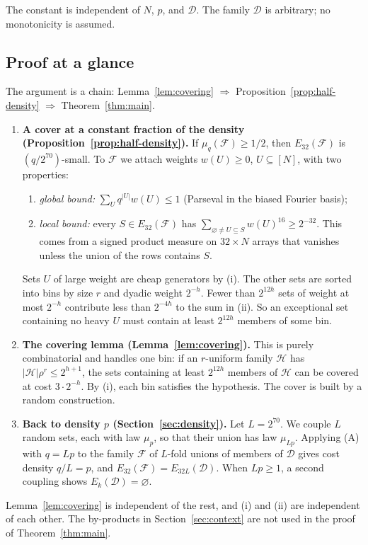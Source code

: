\documentclass[11pt,letterpaper]{article}
\theoremstyle{definition}
\theoremstyle{remark}
\numberwithin{equation}{section}
\begin{document}
The constant is independent of $N$, $p$, and $\mathcal D$. The family $\mathcal D$ is arbitrary; no monotonicity is assumed.

\subsection{Proof at a glance}

The argument is a chain: Lemma~\ref{lem:covering} $\Rightarrow$ Proposition~\ref{prop:half-density} $\Rightarrow$ Theorem~\ref{thm:main}.

\begin{enumerate}[label=(\Alph*)]
\item \textbf{A cover at a constant fraction of the density (Proposition~\ref{prop:half-density}).} If $\mu_q(\mathcal F)\ge1/2$, then $E_{32}(\mathcal F)$ is $(q/2^{70})$-small. To $\mathcal F$ we attach weights $w(U)\ge0$, $U\subseteq[N]$, with two properties:
\begin{enumerate}[label=(\roman*)]
\item \emph{global bound:} $\sum_U q^{|U|}w(U)\le1$ (Parseval in the biased Fourier basis);
\item \emph{local bound:} every $S\in E_{32}(\mathcal F)$ has $\sum_{\varnothing\ne U\subseteq S}w(U)^{16}\ge2^{-32}$. This comes from a signed product measure on $32\times N$ arrays that vanishes unless the union of the rows contains $S$.
\end{enumerate}
Sets $U$ of large weight are cheap generators by (i). The other sets are sorted into bins by size $r$ and dyadic weight $2^{-h}$. Fewer than $2^{12h}$ sets of weight at most $2^{-h}$ contribute less than $2^{-4h}$ to the sum in (ii). So an exceptional set containing no heavy $U$ must contain at least $2^{12h}$ members of some bin.
\item \textbf{The covering lemma (Lemma~\ref{lem:covering}).} This is purely combinatorial and handles one bin: if an $r$-uniform family $\mathcal H$ has $|\mathcal H|\rho^r\le2^{h+1}$, the sets containing at least $2^{12h}$ members of $\mathcal H$ can be covered at cost $3\cdot2^{-h}$. By (i), each bin satisfies the hypothesis. The cover is built by a random construction.
\item \textbf{Back to density $p$ (Section~\ref{sec:density}).} Let $L=2^{70}$. We couple $L$ random sets, each with law $\mu_p$, so that their union has law $\mu_{Lp}$. Applying (A) with $q=Lp$ to the family $\mathcal F$ of $L$-fold unions of members of $\mathcal D$ gives cost density $q/L=p$, and $E_{32}(\mathcal F)=E_{32L}(\mathcal D)$. When $Lp\ge1$, a second coupling shows $E_k(\mathcal D)=\varnothing$.
\end{enumerate}
Lemma~\ref{lem:covering} is independent of the rest, and (i) and (ii) are independent of each other. The by-products in Section~\ref{sec:context} are not used in the proof of Theorem~\ref{thm:main}.
\end{document}

